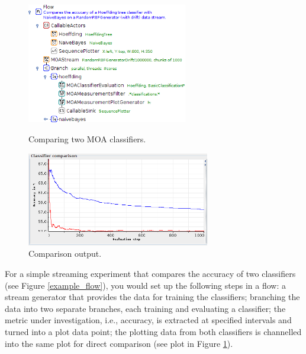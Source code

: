 \documentclass[wcp]{jmlr}
\begin{document}
\begin{figure}[htb]
  \begin{minipage}[b]{0.5\linewidth}
  \centering
  \includegraphics[width=7.0cm]{images/example_flow_clipped.png}
  \caption{Comparing two MOA classifiers.}
  \label{example_flow}
  \end{minipage}%
  \begin{minipage}[b]{0.5\linewidth}
  \centering
  \includegraphics[width=8.0cm]{images/example_output_clipped.png}
  \caption{Comparison output.}
  \label{example_output}
  \end{minipage}
\end{figure}

For a simple streaming experiment that compares the accuracy of two classifiers (see Figure \ref{example_flow}), you would set up the following steps in a flow: a stream generator that provides the data for training the classifiers; branching the data into two separate branches, each training and evaluating a classifier; the metric under investigation, i.e., accuracy, is extracted at specified intervals and turned into a plot data point; the plotting data from both classifiers is channelled into the same plot for direct comparison (see plot in Figure \ref{example_output}).
\end{document}
